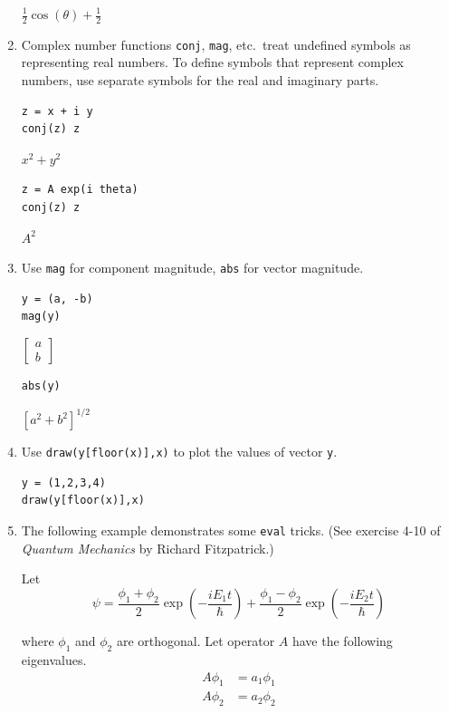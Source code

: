 \documentclass[12pt]{article}
\begin{document}
\begin{enumerate}
$\frac{1}{2}\cos(\theta)+\frac{1}{2}$

\item
Complex number functions \verb$conj$, \verb$mag$, etc.~treat undefined symbols as
representing real numbers.
To define symbols that represent complex numbers, use separate symbols for the
real and imaginary parts.

{\color{blue}
\begin{verbatim}
z = x + i y
conj(z) z
\end{verbatim}}

$x^2+y^2$

{\color{blue}
\begin{verbatim}
z = A exp(i theta)
conj(z) z
\end{verbatim}}

$A^2$

\item
Use \verb$mag$ for component magnitude, \verb$abs$ for vector magnitude.

{\color{blue}
\begin{verbatim}
y = (a, -b)
mag(y)
\end{verbatim}}

$\begin{bmatrix}a\\b\end{bmatrix}$

{\color{blue}
\begin{verbatim}
abs(y)
\end{verbatim}}

$\left[a^2+b^2\right]^{1/2}$

\item
Use \verb$draw(y[floor(x)],x)$ to plot the values of vector \verb$y$.

{\color{blue}
\begin{verbatim}
y = (1,2,3,4)
draw(y[floor(x)],x)
\end{verbatim}}

\newpage

\item
The following example demonstrates some \verb$eval$ tricks.
(See exercise 4-10 of {\it Quantum Mechanics} by Richard Fitzpatrick.)

\bigskip
Let
\begin{equation*}
\psi
=\frac{\phi_1+\phi_2}{2}\exp\left(-\frac{iE_1t}{\hbar}\right)
+\frac{\phi_1-\phi_2}{2}\exp\left(-\frac{iE_2t}{\hbar}\right)
\end{equation*}

where $\phi_1$ and $\phi_2$ are orthogonal.
Let operator $A$ have the following eigenvalues.
\begin{align*}
A\phi_1&=a_1\phi_1
\\
A\phi_2&=a_2\phi_2
\end{align*}


\end{enumerate}
\end{document}
